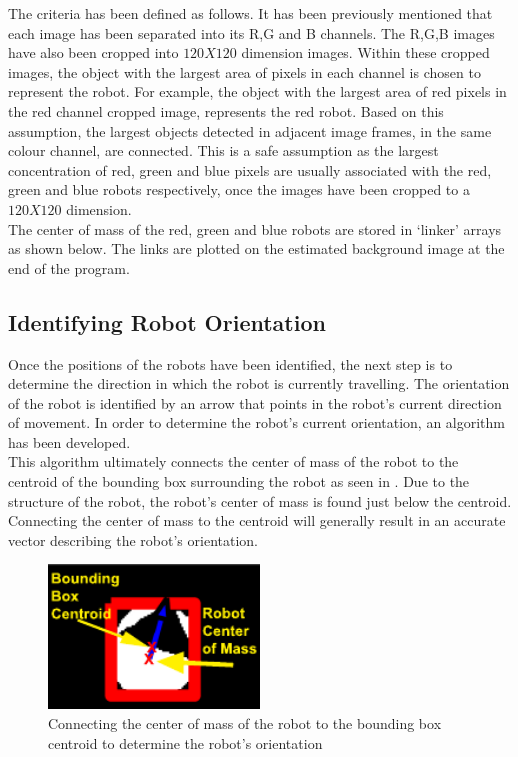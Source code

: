 \documentclass{article}
\begin{document}
The criteria has been defined as follows. It has been previously mentioned that each image has been separated into its R,G and B channels. The R,G,B images have also been cropped into $120X120$ dimension images. Within these cropped images, the object with the largest area of pixels in each channel is chosen to represent the robot. For example, the object with the largest area of red pixels in the red channel cropped image, represents the red robot. Based on this assumption, the largest objects detected in adjacent image frames, in the same colour channel, are connected. This is a safe assumption as the largest concentration of  red, green and blue pixels are usually associated with the red, green and blue robots respectively, once the images have been cropped to a $120X120$ dimension. \\

The center of mass of the red, green and blue robots are stored in `linker' arrays as shown below. The links are plotted on the estimated background image at the end of the program.\\



\subsection{Identifying Robot Orientation}
\label{sec:direction}
Once the positions of the robots have been identified, the next step is to determine the direction in which the robot is currently travelling. The orientation of the robot is identified by an arrow that points in the robot's current direction of movement. In order to determine the robot's current orientation, an algorithm has been developed.  \\

This algorithm ultimately connects the center of mass of the robot to the centroid of the bounding box surrounding the robot as seen in . Due to the structure of the robot, the robot's center of mass is found just below the centroid. Connecting the center of mass to the centroid will generally result in an accurate vector describing the robot's orientation.\\

\begin{figure}[h!]
	\centering
		\includegraphics[width=0.5\textwidth]{../Drawings/orientationAlgorithm.pdf}
	\caption{Connecting the center of mass of the robot to the bounding box centroid to determine the robot's orientation}
	\label{fig:orientation}
\end{figure}
\end{document}
